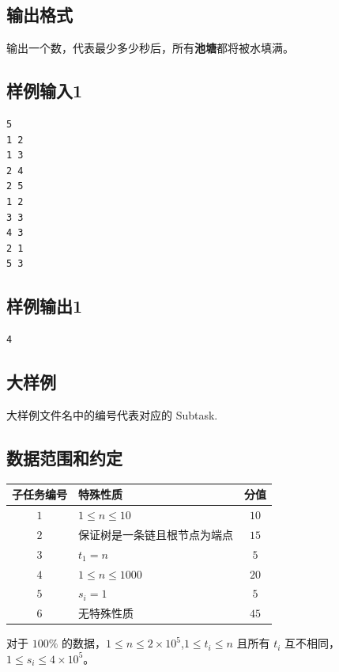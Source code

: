 \subsection{输出格式}

输出一个数，代表最少多少秒后，所有\textbf{池塘}都将被水填满。

\subsection{样例输入1}

\begin{lstlisting}
5
1 2
1 3
2 4
2 5
1 2
3 3
4 3
2 1
5 3
\end{lstlisting}

\subsection{样例输出1}

\begin{lstlisting}
4
\end{lstlisting}


\subsection{大样例}

大样例文件名中的编号代表对应的 Subtask.

\subsection{数据范围和约定}


{
\centering
\begin{tabularx}{0.75\linewidth}{|c| >{\centering\arraybackslash}X|c|}
 \hline
 子任务编号 & 特殊性质 & 分值 \\ \hline
 $1$ & $1 \le n \le 10$ & $10$ \\ \hline
 $2$ & 保证树是一条链且根节点为端点 & $15$ \\ \hline
 $3$ & $t_1 = n$ & $5$ \\ \hline
 $4$ & $1 \le n \le 1000$ & $20$ \\ \hline
 $5$ & $s_i = 1$ & $5$ \\ \hline
 $6$ & 无特殊性质 & $45$ \\ \hline
\end{tabularx}
\par
}

\vspace{\baselineskip}

对于 $100\%$ 的数据，$1 \le n \le 2 \times 10^5$,$1 \le t_i \le n$ 且所有 $t_i$ 互不相同，$1 \le s_i \le 4 \times 10^5$。
